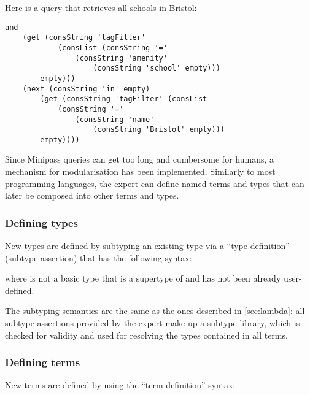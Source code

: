 \documentclass[main.tex]{subfiles}
\begin{document}
\begin{example}
\label{example:schools}
    Here is a query that retrieves all schools in Bristol:
    \begin{lstwrap}\begin{lstlisting}
and
    (get (consString 'tagFilter'
            (consList (consString '='
                (consString 'amenity'
                    (consString 'school' empty)))
        empty)))
    (next (consString 'in' empty)
        (get (consString 'tagFilter' (consList
            (consString '='
                (consString 'name'
                    (consString 'Bristol' empty)))
        empty))))
    \end{lstlisting}\end{lstwrap}
\end{example}

Since Minipass queries can get too long and cumbersome for humans,
a mechanism for modularisation has been implemented. Similarly to most
programming languages, the expert can define
named terms and types that can later be composed into other terms and types.

\subsubsection{Defining types}\label{sec:definingtypes}
New types are defined by subtyping an existing type via a ``type definition''
(subtype assertion) that has the following syntax:
\begin{center}
\end{center}
where  is not a basic type that is a supertype of  
and has not been
already user-defined.

The subtyping semantics
are the same as the ones described in \cref{sec:lambda}: all subtype assertions
provided by the expert
make up a subtype library, which is checked for validity and used for resolving
the types contained in all terms.

\subsubsection{Defining terms}
New terms are defined by using the ``term definition'' syntax:
\begin{center}
\end{center}
\end{document}
